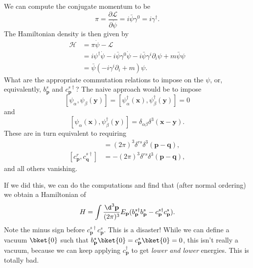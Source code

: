 \documentclass[a4paper]{article}
\begin{document}
We can compute the conjugate momentum to be
\[
  \pi = \frac{\partial \mathcal{L}}{\partial \dot\psi} = i \bar\psi \gamma^0 = i \gamma^\dagger.
\]
The Hamiltonian density is then given by
\begin{align*}
  \mathcal{H} &= \pi \dot\psi - \mathcal{L} \\
  &= i\psi^\dagger \dot\psi - i \bar\psi \gamma^0 \dot\psi - i \bar\psi \gamma^i \partial_i \psi + m \bar\psi \psi\\
  &= \bar\psi(-i \gamma^i \partial_i + m) \psi.
\end{align*}
What are the appropriate commutation relations to impose on the $\psi$, or, equivalently, $b_\mathbf{p}^s$ and $c_\mathbf{p}^{s\dagger}$? The naive approach would be to impose
\[
  [\psi_\alpha, \psi_\beta(\mathbf{y})] = [\psi_\alpha^\dagger(\mathbf{x}), \psi^\dagger_\beta(\mathbf{y})] = 0
\]
and
\[
  [\psi_\alpha(\mathbf{x}), \psi_\beta^\dagger(\mathbf{y})] = \delta_{\alpha\beta}\delta^3(\mathbf{x} - \mathbf{y}).
\]
These are in turn equivalent to requiring
\begin{align*}
  [b_\mathbf{p}^r, b_\mathbf{q}^{s\dagger}] &= (2\pi)^3 \delta^{rs}\delta^3(\mathbf{p} - \mathbf{q}),\\
  [c_\mathbf{p}^r, c_\mathbf{q}^{s\dagger}] &= -(2\pi)^3 \delta^{rs} \delta^3(\mathbf{p} - \mathbf{q}),
\end{align*}
and all others vanishing.

If we did this, we can do the computations and find that (after normal ordering) we obtain a Hamiltonian of
\[
  H = \int \frac{\d^3 \mathbf{p}}{(2\pi)^3} E_\mathbf{p}(b_\mathbf{p}^{s\dagger}b_\mathbf{p}^s - c_\mathbf{p}^{s\dagger}c_\mathbf{p}^s).
\]
Note the minus sign before $c_\mathbf{p}^{s\dagger}c_\mathbf{p}^s$. This is a disaster! While we can define a vacuum $\bket{0}$ such that $b_\mathbf{p}^s \bket{0} = c_\mathbf{p}^s \bket{0} = 0$, this isn't really a vacuum, because we can keep applying $c_\mathbf{p}^\dagger$ to get \emph{lower and lower} energies. This is totally bad.
\end{document}
